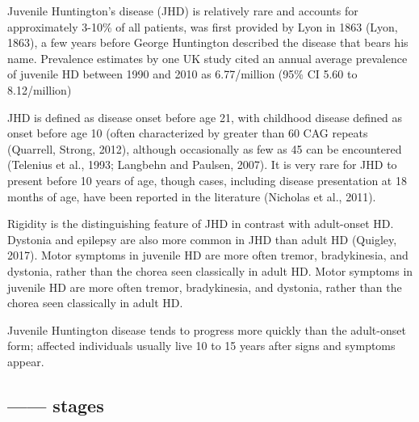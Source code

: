 Juvenile Huntington's disease (JHD)  is relatively rare and accounts for
approximately 3-10\% of all patients, was first provided by Lyon in 1863 (Lyon,
1863), a few years before George Huntington described the disease that bears his
name. Prevalence estimates by one UK study cited an annual average prevalence of
juvenile HD between 1990 and 2010 as 6.77/million (95\% CI 5.60 to 8.12/million) 


JHD is defined as disease onset before age 21, with childhood disease defined as
onset before age 10 (often characterized by greater than 60 CAG repeats
(Quarrell, Strong, 2012), although occasionally as few as 45 can be encountered
(Telenius et al., 1993; Langbehn and Paulsen, 2007). It is very rare for JHD to
present before 10 years of age, though cases, including disease presentation at
18 months of age, have been reported in the literature (Nicholas et al., 2011).



Rigidity is the distinguishing feature of JHD in contrast with adult-onset HD.
Dystonia and epilepsy are also more common in JHD than adult HD (Quigley, 2017).
Motor symptoms in juvenile HD are more often tremor, bradykinesia, and dystonia,
rather than the chorea seen classically in adult HD. 
Motor symptoms in juvenile HD are more often tremor, bradykinesia, and dystonia,
rather than the chorea seen classically in adult HD. 

Juvenile Huntington disease tends to progress more quickly than the adult-onset
form; affected individuals usually live 10 to 15 years after signs and symptoms
appear. 


\subsection{------ stages }


